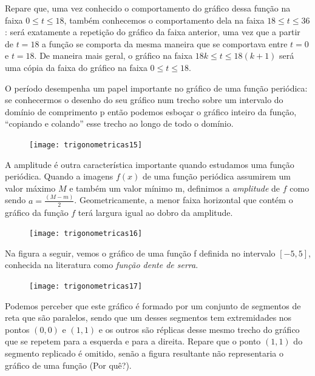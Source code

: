 Repare que, uma vez conhecido o comportamento do gráfico dessa função na faixa $0\leq t\leq18$, também conhecemos o comportamento dela na faixa $18\leq t\leq 36$: será exatamente a repetição do gráfico da faixa anterior, uma vez que a partir de $t=18$ a função se comporta da mesma maneira que se comportava entre $t=0$ e $t=18$. De maneira mais geral, o gráfico na faixa $18k\leq t\leq 18(k+1)$ será uma cópia da faixa do gráfico na faixa $0\leq t\leq 18$.

O período desempenha um papel importante no gráfico de uma função periódica: se conhecermos o desenho do seu gráfico num trecho sobre um intervalo do domínio de comprimento p então podemos esboçar o gráfico inteiro da função, “copiando e colando”{} esse trecho ao longo de todo o domínio.

\begin{figure}[H]
\centering

\texttt{[image: trigonometricas15]}
\end{figure}

A amplitude é outra característica importante quando estudamos uma função periódica. Quando a imagens $f(x)$ de uma função periódica assumirem um valor máximo $M$ e também um valor mínimo m, definimos a \textit{amplitude} de $f$ como sendo $a=\frac{(M-m)}{2}$. Geometricamente, a menor faixa horizontal que contém o gráfico da função $f$ terá largura igual ao dobro da amplitude.

\begin{figure}[H]
\centering

\texttt{[image: trigonometricas16]}
\end{figure}

Na figura a seguir, vemos o gráfico de uma função f definida no intervalo $[-5,5]$, conhecida na literatura como \textit{função dente de serra}.

\begin{figure}[H]
\centering

\texttt{[image: trigonometricas17]}
\end{figure}

Podemos perceber que este gráfico é formado por um conjunto de segmentos de reta que são paralelos, sendo que um desses segmentos tem extremidades nos pontos $(0,0)$ e $(1,1)$ e os outros são réplicas desse mesmo trecho do gráfico que se repetem para a esquerda e para a direita. Repare que o ponto $(1,1)$ do segmento replicado é omitido, senão a figura resultante não representaria o gráfico de uma função (Por quê?).


